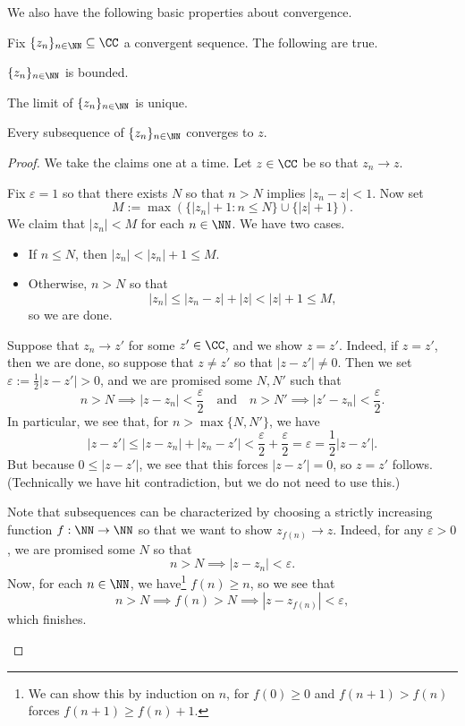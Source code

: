 We also have the following basic properties about convergence.
\begin{proposition}
	Fix $\{z_n\}_{n\in\NN}\subseteq\CC$ a convergent sequence. The following are true.
	\begin{listalph}
		\item $\{z_n\}_{n\in\NN}$ is bounded.
		\item The limit of $\{z_n\}_{n\in\NN}$ is unique.
		\item Every subsequence of $\{z_n\}_{n\in\NN}$ converges to $z$.
	\end{listalph}
\end{proposition}
\begin{proof}
	We take the claims one at a time. Let $z\in\CC$ be so that $z_n\to z$.
	\begin{listalph}
		\item Fix $\varepsilon=1$ so that there exists $N$ so that $n>N$ implies $|z_n-z|<1$. Now set
		\[M:=\max(\{|z_n|+1:n\le N\}\cup\{|z|+1\}).\]
		We claim that $|z_n|<M$ for each $n\in\NN$. We have two cases.
		\begin{itemize}
			\item If $n\le N$, then $|z_n|<|z_n|+1\le M$.
			\item Otherwise, $n>N$ so that
			\[|z_n|\le|z_n-z|+|z|<|z|+1\le M,\]
			so we are done.
		\end{itemize}

		\item Suppose that $z_n\to z'$ for some $z'\in\CC$, and we show $z=z'$. Indeed, if $z=z'$, then we are done, so suppose that $z\ne z'$ so that $|z-z'|\ne0$. Then we set $\varepsilon:=\frac12|z-z'|>0$, and we are promised some $N,N'$ such that
		\[n>N\implies|z-z_n|<\frac\varepsilon2\quad\text{and}\quad n>N'\implies|z'-z_n|<\frac\varepsilon2.\]
		In particular, we see that, for $n>\max\{N,N'\}$, we have
		\[|z-z'|\le|z-z_n|+|z_n-z'|<\frac\varepsilon2+\frac\varepsilon2=\varepsilon=\frac12|z-z'|.\]
		But because $0\le|z-z'|$, we see that this forces $|z-z'|=0$, so $z=z'$ follows. (Technically we have hit contradiction, but we do not need to use this.)

		\item Note that subsequences can be characterized by choosing a strictly increasing function $f:\NN\to\NN$ so that we want to show $z_{f(n)}\to z$. Indeed, for any $\varepsilon>0$, we are promised some $N$ so that
		\[n>N\implies|z-z_n|<\varepsilon.\]
		Now, for each $n\in\NN$, we have\footnote{We can show this by induction on $n$, for $f(0)\ge0$ and $f(n+1)>f(n)$ forces $f(n+1)\ge f(n)+1$.} $f(n)\ge n$, so we see that
		\[n>N\implies f(n)>N\implies|z-z_{f(n)}|<\varepsilon,\]
		which finishes.
		\qedhere
	\end{listalph}
\end{proof}

